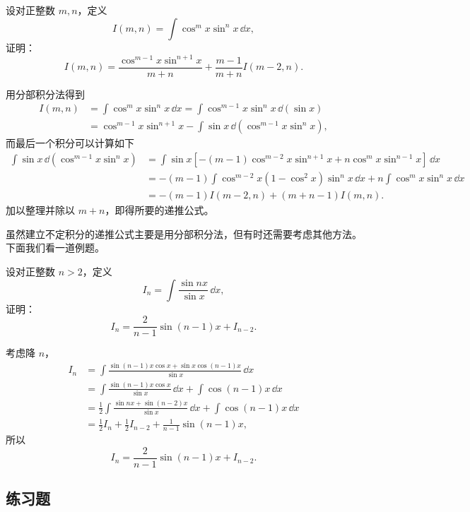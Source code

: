 \begin{xexample}[9.1.10]
设对正整数 $m,n$，定义
\[
  I(m,n)=\int\cos^mx\sin^nx\,\dd x,
\]
证明：
\[
  I(m,n)=\frac{\cos^{m-1}x\sin^{n+1}x}{m+n}
    +\frac{m-1}{m+n}I(m-2,n).
\]
\end{xexample}

\begin{xproof}
用分部积分法得到
\begin{align*}
  I(m,n)
  &=\int\cos^mx\sin^nx\,\dd x
   =\int\cos^{m-1}x\sin^nx\,\dd(\sin x)\\
  &=\cos^{m-1}x\sin^{n+1}x
    -\int\sin x\,\dd(\cos^{m-1}x\sin^nx),
\end{align*}
而最后一个积分可以计算如下
\begin{align*}
  \int\sin x\,\dd(\cos^{m-1}x\sin^nx)
  &=\int\sin x[-(m-1)\cos^{m-2}x\sin^{n+1}x
    +n\cos^mx\sin^{n-1}x]\,\dd x\\
  &=-(m-1)\int\cos^{m-2}x(1-\cos^2x)\sin^nx\,\dd x
    +n\int\cos^mx\sin^nx\,\dd x\\
  &=-(m-1)I(m-2,n)+(m+n-1)I(m,n).
\end{align*}
加以整理并除以 $m+n$，即得所要的递推公式。
\end{xproof}

虽然建立不定积分的递推公式主要是用分部积分法，但有时还需要考虑其他方法。下面我们看一道例题。

\begin{xexample}[9.1.11]
设对正整数 $n>2$，定义
\[
  I_n=\int\frac{\sin nx}{\sin x}\,\dd x,
\]
证明：
\[
  I_n=\frac2{n-1}\sin(n-1)x+I_{n-2}.
\]
\end{xexample}

\begin{xproof}
考虑降 $n$，
\begin{align*}
  I_n
  &=\int\frac{\sin(n-1)x\cos x+\sin x\cos(n-1)x}{\sin x}\,\dd x\\
  &=\int\frac{\sin(n-1)x\cos x}{\sin x}\,\dd x+\int\cos(n-1)x\,\dd x\\
  &=\frac12\int\frac{\sin nx+\sin(n-2)x}{\sin x}\,\dd x
    +\int\cos(n-1)x\,\dd x\\
  &=\frac12I_n+\frac12I_{n-2}+\frac1{n-1}\sin(n-1)x,
\end{align*}
所以
\[
  I_n=\frac2{n-1}\sin(n-1)x+I_{n-2}.
\]
\end{xproof}

\subsection{练习题}


